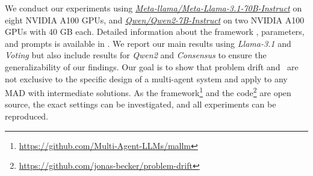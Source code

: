 
We conduct our experiments using \href{https://huggingface.co/meta-llama/Llama-3.1-70B-Instruct}{\textit{Meta-llama/Meta-Llama-3.1-70B-Instruct}} on eight NVIDIA A100 GPUs, and \href{https://huggingface.co/Qwen/Qwen2-7B-Instruct}{\textit{Qwen/Qwen2-7B-Instruct}} on two NVIDIA A100 GPUs with 40 GB each.
Detailed information about the framework \citep{becker2025mallmmultiagentlargelanguage}, parameters, and prompts is available in .
We report our main results using \textit{Llama-3.1} and \textit{Voting} but also include results for \textit{Qwen2} and \textit{Consensus} to ensure the generalizability of our findings.
Our goal is to show that problem drift and \metric\ are not exclusive to the specific design of a multi-agent system and apply to any MAD with intermediate solutions.
As the framework\footnote{\url{https://github.com/Multi-Agent-LLMs/mallm}} and the code\footnote{\url{https://github.com/jonas-becker/problem-drift}} are open source, the exact settings can be investigated, and all experiments can be reproduced.


